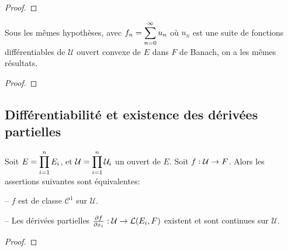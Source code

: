 \begin{proof}
	
\end{proof}

\begin{corollary}
	Sous les mêmes hypothèses, avec $f_{n} = \displaystyle \sum_{n = 0}^{\infty} u_{n}$ où
	$u_{n}$ est une suite de fonctions différentiables de $\mathcal{U}$ ouvert
	convexe de $E$ dans $F$ de Banach, on a les mêmes résultats.
\end{corollary}

\begin{proof}
	
\end{proof}

\subsection{Différentiabilité et existence des dérivées partielles}

\begin{theorem}
\label{theorem_partial_derivative_existence}

	Soit $E = \displaystyle \prod_{i = 1}^{n} E_{i}$, et $\mathcal{U} =
	\displaystyle \prod_{i = 1}^{n} \mathcal{U}_{i}$ un ouvert de $E$.
	Soit $f : \mathcal{U} \rightarrow F$.
	Alors les assertions suivantes sont équivalentes:
	
	-- $f$ est de classe $\mathcal{C}^{1}$ sur $\mathcal{U}$.

	-- Les dérivées partielles 
	$\pdv{f}{x_{i}} : \mathcal{U} \rightarrow \mathcal{L}(E_{i}, F)$
	existent et sont continues sur $\mathcal{U}$.
\end{theorem}

\begin{proof}
	
\end{proof}
